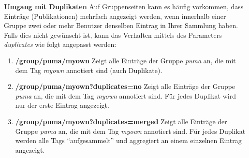 \textbf{Umgang mit Duplikaten}\newline
Auf Gruppenseiten kann es häufig vorkommen, dass Einträge (Publikationen) mehrfach angezeigt werden, wenn innerhalb einer Gruppe zwei oder mehr Benutzer denselben Eintrag in Ihrer Sammlung haben.\newline
Falls dies nicht gewünscht ist, kann das Verhalten mittels des Parameters \textit{duplicates} wie folgt angepasst werden:
\begin{enumerate}
    \item \textbf{/group/puma/myown} \newline
    Zeigt alle Einträge der Gruppe \textit{puma} an, die mit dem Tag \textit{myown} annotiert sind (auch Duplikate).
    \item \textbf{/group/puma/myown?duplicates=no} \newline
    Zeigt alle Einträge der Gruppe \textit{puma} an, die mit dem Tag \textit{myown} annotiert sind. Für jedes Duplikat wird nur der erste Eintrag angezeigt.
    \item \textbf{/group/puma/myown?duplicates=merged} \newline
    Zeigt alle Einträge der Gruppe \textit{puma} an, die mit dem Tag \textit{myown} annotiert sind. Für jedes Duplikat werden alle Tags \enquote{aufgesammelt} und aggregiert an einem einzelnen Eintrag angezeigt.
\end{enumerate}


